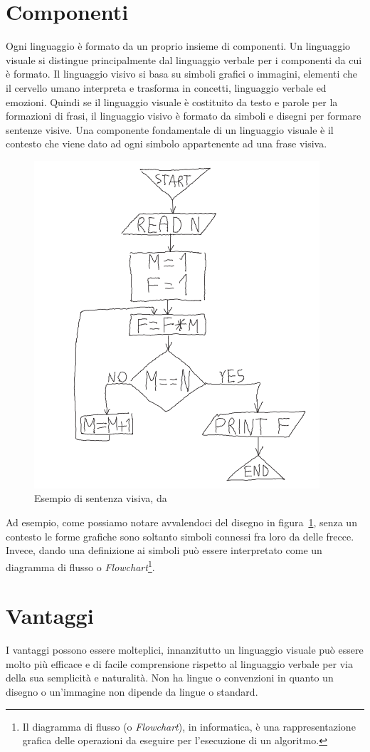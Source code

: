     \section{Componenti}
        Ogni linguaggio è formato da un proprio insieme di componenti. Un linguaggio visuale si distingue principalmente dal linguaggio verbale per i componenti da cui è formato. Il linguaggio visivo si basa su simboli grafici o immagini, elementi che il cervello umano interpreta e trasforma in concetti, linguaggio verbale ed emozioni. Quindi se il linguaggio visuale è costituito da testo e parole per la formazioni di frasi, il linguaggio visivo è formato da simboli e disegni per formare sentenze visive.
        Una componente fondamentale di un linguaggio visuale è il contesto che viene dato ad ogni simbolo appartenente ad una frase visiva.
        \begin{figure}[htbp]
            \centering
            \includegraphics[scale=0.6]{Figure/diagram.PNG}
            \caption{Esempio di sentenza visiva, da~\cite{localcontext_recognition}}
            \label{fig:diagram}
        \end{figure}
        Ad esempio, come possiamo notare avvalendoci del disegno in figura~\ref{fig:diagram}, senza un contesto le forme grafiche sono soltanto simboli connessi fra loro da delle frecce. Invece, dando una definizione ai simboli può essere interpretato come un diagramma di flusso o \textit{Flowchart}\footnote{Il diagramma di flusso (o \textit{Flowchart}), in informatica, è una rappresentazione grafica delle operazioni da eseguire per l'esecuzione di un algoritmo.}.

    \section{Vantaggi}
        I vantaggi possono essere molteplici, innanzitutto un linguaggio visuale può essere molto più efficace e di facile comprensione rispetto al linguaggio verbale per via della sua semplicità e naturalità. Non ha lingue o convenzioni in quanto un disegno o un'immagine non dipende da lingue o standard.